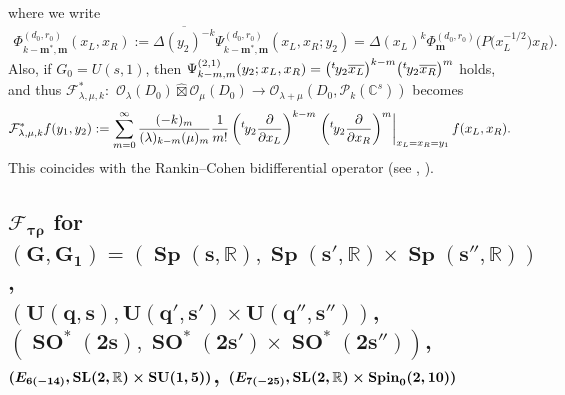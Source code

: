 \documentclass[pdftex]{sigma}
\numberwithin{equation}{section}
\newcommand{\bm}{\mathbf{m}}
\newcommand{\BR}{\mathbb{R}}
\newcommand{\BC}{\mathbb{C}}
\newcommand{\cF}{\mathcal{F}}
\newcommand{\cO}{\mathcal{O}}
\newcommand{\cP}{\mathcal{P}}
\newcommand{\hboxtimes}{\mathbin{\hat{\boxtimes}}}
\begin{document}
where we write
\begin{gather*} \Phi_{k-\bm^*,\bm}^{(d_0,r_0)}(x_L,x_R):=
\overline{\Delta(y_2)^{-k}}\Psi_{k-\bm^*,\bm}^{(d_0,r_0)}(x_L,x_R;y_2)=\Delta(x_L)^k\Phi_\bm^{(d_0,r_0)}\big(P\big(x^{-1/2}_L\big)x_R\big). \end{gather*}
Also, if $G_0=U(s,1)$, then $\Psi_{k-m,m}^{(2,1)}(y_2;x_L,x_R)
=\big({}^t\hspace{-1pt}y_2\overline{x_L}\big)^{k-m}\big({}^t\hspace{-1pt}y_2\overline{x_R}\big)^m$ holds, and thus
$\cF_{\lambda,\mu,k}^*\colon$ $ \cO_\lambda(D_0)\hboxtimes\cO_\mu(D_0)\to \cO_{\lambda+\mu}(D_0,\cP_{k}(\BC^s))$ becomes
\begin{gather*} \cF_{\lambda,\mu,k}^*f(y_1,y_2)
:=\sum_{m=0}^\infty\frac{(-k)_m}{(\lambda)_{k-m}(\mu)_m}\frac{1}{m!}
\left({}^t\hspace{-1pt}y_2\frac{\partial}{\partial x_L}\right)^{k-m}\left.\left({}^t\hspace{-1pt}y_2\frac{\partial}{\partial x_R}\right)^m
\right|_{x_L=x_R=y_1}f(x_L,x_R). \end{gather*}
This coincides with the Rankin--Cohen bidifferential operator (see \cite[Theorem~7.1]{C}, \cite[Theorem~8.1(2)]{KP2}).

\subsection[$\cF_{\tau\rho}$ for $(G,G_1)=(\operatorname{Sp}(s,\BR), \operatorname{Sp}(s',\BR)\times \operatorname{Sp}(s'',\BR))$, \\
$(U(q,s), U(q',s')\times U(q'',s''))$, $(\operatorname{SO}^*(2s), \operatorname{SO}^*(2s')\times \operatorname{SO}^*(2s''))$, \\
$(E_{6(-14)}, {\rm SL}(2,\BR)\times \operatorname{SU}(1,5))$, $(E_{7(-25)}, {\rm SL}(2,\BR)\times \operatorname{Spin}_0(2,10))$]{$\boldsymbol{\cF_{\tau\rho}}$ for $\boldsymbol{(G,G_1)=(\operatorname{Sp}(s,\BR), \operatorname{Sp}(s',\BR)\times \operatorname{Sp}(s'',\BR))}$, \\
$\boldsymbol{(U(q,s), U(q',s')\times U(q'',s''))}$, $\boldsymbol{(\operatorname{SO}^*(2s), \operatorname{SO}^*(2s')\times \operatorname{SO}^*(2s''))}$, \\
$\boldsymbol{(E_{6(-14)}, {\rm SL}(2,\BR)\times \operatorname{SU}(1,5))}$, $\boldsymbol{(E_{7(-25)}, {\rm SL}(2,\BR)\times \operatorname{Spin}_0(2,10))}$}
\end{document}
